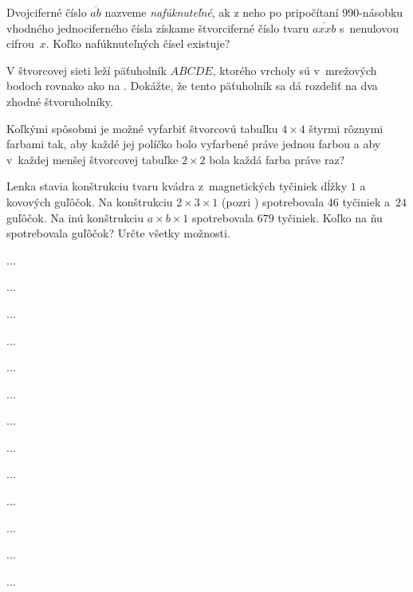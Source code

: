 {%
Dvojciferné číslo $\overline{ab}$ nazveme \emph{nafúknuteľné}, ak z neho po pripočítaní 990-násobku vhodného jednociferného čísla získame štvorciferné číslo tvaru $\overline{axxb}$ s~nenulovou cifrou~$x$. Koľko nafúknuteľných čísel existuje?
}

{%
V štvorcovej sieti leží päťuholník $ABCDE$, ktorého vrcholy sú v~mrežových bodoch rovnako ako na \obr. Dokážte, že tento päťuholník sa dá rozdeliť na dva zhodné štvoruholníky.
%
}

{%
Koľkými spôsobmi je možné vyfarbiť štvorcovú tabuľku $4\times 4$ štyrmi rôznymi farbami tak, aby každé jej políčko bolo vyfarbené práve jednou farbou a aby v~každej menšej štvorcovej tabuľke $2\times 2$ bola každá farba práve raz?
}

{%
Lenka stavia konštrukciu tvaru kvádra z~magnetických tyčiniek dĺžky $1$ a kovových guľôčok. Na konštrukciu $2 \times 3\times1$ (pozri \obr) spotrebovala $46$ tyčiniek a~$24$ guľôčok. Na inú konštrukciu $a\times b\times1$ spotrebovala $679$ tyčiniek. Koľko na ňu spotrebovala guľôčok? Určte všetky možnosti.
%
}

{%
...}

{%
...}

{%
...}

{%
...}

{%
...}

{%
...}

{%
...}

{%
...}

{%
...}

{%
...}

{%
...}

{%
...}

{%
...}

